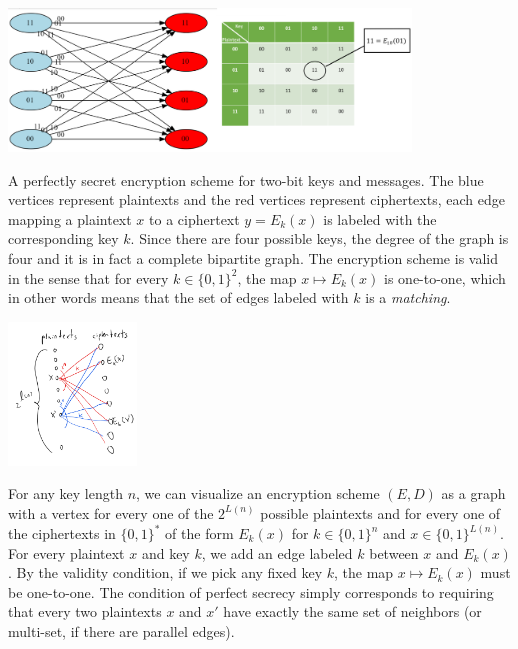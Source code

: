\begin{marginfigure}
\centering
\includegraphics[width=\linewidth, height=1.5in, keepaspectratio]{../figure/onetimepadtwobits.png}
\caption{A perfectly secret encryption scheme for two-bit keys and
messages. The blue vertices represent plaintexts and the red vertices
represent ciphertexts, each edge mapping a plaintext \(x\) to a
ciphertext \(y=E_k(x)\) is labeled with the corresponding key \(k\).
Since there are four possible keys, the degree of the graph is four and
it is in fact a complete bipartite graph. The encryption scheme is valid
in the sense that for every \(k\in \{0,1\}^2\), the map
\(x \mapsto E_k(x)\) is one-to-one, which in other words means that the
set of edges labeled with \(k\) is a \emph{matching}.}
\label{onetimepadtwofig}
\end{marginfigure}

\begin{marginfigure}
\centering
\includegraphics[width=\linewidth, height=1.5in, keepaspectratio]{../figure/perfectsecrecy.png}
\caption{For any key length \(n\), we can visualize an encryption scheme
\((E,D)\) as a graph with a vertex for every one of the \(2^{L(n)}\)
possible plaintexts and for every one of the ciphertexts in
\(\{0,1\}^*\) of the form \(E_k(x)\) for \(k\in \{0,1\}^n\) and
\(x\in \{0,1\}^{L(n)}\). For every plaintext \(x\) and key \(k\), we add
an edge labeled \(k\) between \(x\) and \(E_k(x)\). By the validity
condition, if we pick any fixed key \(k\), the map \(x \mapsto E_k(x)\)
must be one-to-one. The condition of perfect secrecy simply corresponds
to requiring that every two plaintexts \(x\) and \(x'\) have exactly the
same set of neighbors (or multi-set, if there are parallel edges).}
\label{perfectsecfig}
\end{marginfigure}


